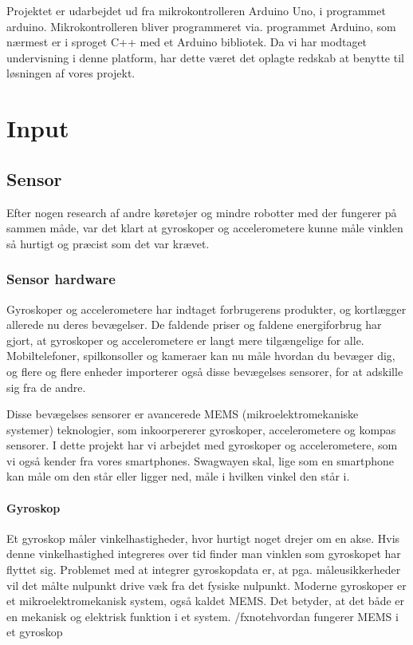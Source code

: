 \documentclass[a4paper,oneside,article,danish,table]{memoir}
\begin{document}
Projektet er udarbejdet ud fra mikrokontrolleren Arduino Uno, i programmet arduino. Mikrokontrolleren bliver programmeret via. programmet Arduino, som nærmest er i sproget C++ med et Arduino bibliotek. Da vi har modtaget undervisning i denne platform, har dette været det oplagte redskab at benytte til løsningen af vores projekt.

\chapter{Input}
\section{Sensor}
Efter nogen research af andre køretøjer og mindre robotter med der fungerer på sammen måde, var det klart at gyroskoper og accelerometere kunne måle vinklen så hurtigt og præcist som det var krævet.
\subsection{Sensor hardware}
Gyroskoper og accelerometere har indtaget forbrugerens produkter, og kortlægger allerede nu deres bevægelser. De faldende priser og faldene energiforbrug har gjort, at gyroskoper og accelerometere er langt mere tilgængelige for alle. Mobiltelefoner, spilkonsoller og kameraer kan nu måle hvordan du bevæger dig, og flere og flere enheder importerer også disse bevægelses sensorer, for at adskille sig fra de andre.

Disse bevægelses sensorer er avancerede MEMS (mikroelektromekaniske systemer) teknologier, som inkoorpererer gyroskoper, accelerometere og kompas sensorer. %
I dette projekt har vi arbejdet med gyroskoper og accelerometere, som vi også kender fra vores smartphones. Swagwayen skal, lige som en smartphone kan måle om den står eller ligger ned, måle i hvilken vinkel den står i.   

\subsubsection{Gyroskop}
Et gyroskop måler vinkelhastigheder, hvor hurtigt noget drejer om en akse. Hvis denne vinkelhastighed integreres over tid finder man vinklen som gyroskopet har flyttet sig. Problemet med at integrer gyroskopdata er, at pga. måleusikkerheder vil det målte nulpunkt drive væk fra det fysiske nulpunkt. Moderne gyroskoper er et mikroelektromekanisk system, også kaldet MEMS. Det betyder, at det både er en mekanisk og elektrisk funktion i et system. /fxnote{hvordan fungerer MEMS i et gyroskop}
\end{document}
